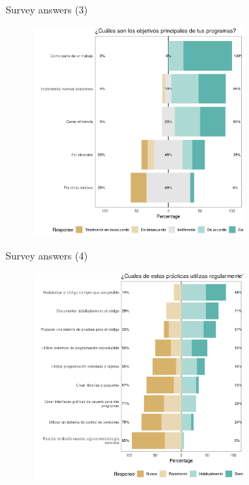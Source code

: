 \documentclass[ignorenonframetext,]{beamer}
\begin{document}
\begin{frame}{%
	\protect\hypertarget{results3}{%
		Survey answers (3)}}

\begin{figure}
	\includegraphics[width=0.7\textwidth]{"images/results3"}
\end{figure}

\end{frame}

\begin{frame}{%
	\protect\hypertarget{results4}{%
		Survey answers (4)}}

\begin{figure}
	\includegraphics[width=0.7\textwidth]{"images/results4"}
\end{figure}

\end{frame}
\end{document}
